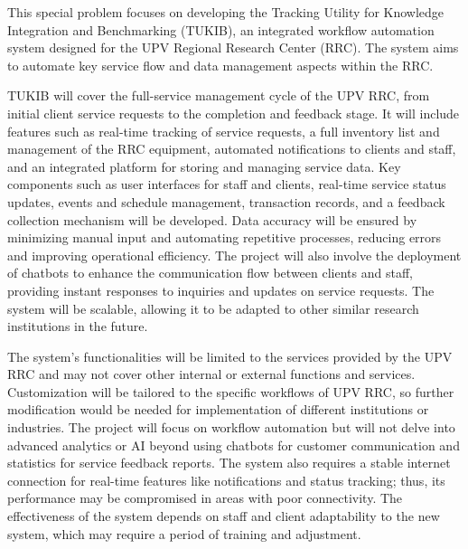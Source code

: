 This special problem focuses on developing the Tracking Utility for Knowledge Integration and Benchmarking (TUKIB), an integrated workflow automation system designed for the UPV Regional Research Center (RRC). The system aims to automate key service flow and data management aspects within the RRC. 

TUKIB will cover the full-service management cycle of the UPV RRC, from initial client service requests to the completion and feedback stage. It will include features such as real-time tracking of service requests, a full inventory list and management of the RRC equipment, automated notifications to clients and staff, and an integrated platform for storing and managing service data. Key components such as user interfaces for staff and clients, real-time service status updates, events and schedule management, transaction records,  and a feedback collection mechanism will be developed. Data accuracy will be ensured by minimizing manual input and automating repetitive processes, reducing errors and improving operational efficiency. The project will also involve the deployment of chatbots to enhance the communication flow between clients and staff, providing instant responses to inquiries and updates on service requests. The system will be scalable, allowing it to be adapted to other similar research institutions in the future.

The system’s functionalities will be limited to the services provided by the UPV RRC and may not cover other internal or external functions and services. Customization will be tailored to the specific workflows of UPV RRC, so further modification would be needed for implementation of different institutions or industries. The project will focus on workflow automation but will not delve into advanced analytics or AI beyond using chatbots for customer communication and statistics for service feedback reports. The system also requires a stable internet connection for real-time features like notifications and status tracking; thus, its performance may be compromised in areas with poor connectivity. The effectiveness of the system depends on staff and client adaptability to the new system, which may require a period of training and adjustment.


\begin{comment}

%
%
Generally, one paragraph should be allotted for each of your research objectives.

Each paragraph contains a brief overview of the concept/theory and the purpose of doing the associated objective.

Each paragraph also includes a description of the scope/limitation of your study.

* Please refer to the slides for examples.

\end{comment}


